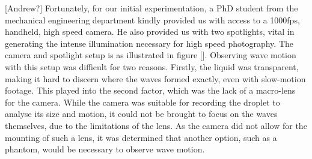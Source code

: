 [Andrew?] Fortunately, for our initial experimentation, a PhD student from the mechanical engineering department kindly provided us with access to a 1000fps, handheld, high speed camera. He also provided us with two spotlights, vital in generating the intense illumination necessary for high speed photography. The camera and spotlight setup is as illustrated in figure []. Observing wave motion with this setup was difficult for two reasons. Firstly, the liquid was transparent, making it hard to discern where the waves formed exactly, even with slow-motion footage. This played into the second factor, which was the lack of a macro-lens for the camera. While the camera was suitable for recording the droplet to analyse its size and motion, it could not be brought to focus on the waves themselves, due to the limitations of the lens. As the camera did not allow for the mounting of such a lens, it was determined that another option, such as a phantom, would be necessary to observe wave motion.  
